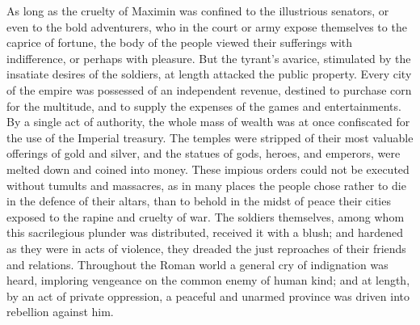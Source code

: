 As long as the cruelty of Maximin was confined to the illustrious
senators, or even to the bold adventurers, who in the court or
army expose themselves to the caprice of fortune, the body of the
people viewed their sufferings with indifference, or perhaps with
pleasure. But the tyrant’s avarice, stimulated by the insatiate
desires of the soldiers, at length attacked the public property.
Every city of the empire was possessed of an independent revenue,
destined to purchase corn for the multitude, and to supply the
expenses of the games and entertainments. By a single act of
authority, the whole mass of wealth was at once confiscated for
the use of the Imperial treasury. The temples were stripped of
their most valuable offerings of gold and silver, and the statues
of gods, heroes, and emperors, were melted down and coined into
money. These impious orders could not be executed without tumults
and massacres, as in many places the people chose rather to die
in the defence of their altars, than to behold in the midst of
peace their cities exposed to the rapine and cruelty of war. The
soldiers themselves, among whom this sacrilegious plunder was
distributed, received it with a blush; and hardened as they were
in acts of violence, they dreaded the just reproaches of their
friends and relations. Throughout the Roman world a general cry
of indignation was heard, imploring vengeance on the common enemy
of human kind; and at length, by an act of private oppression, a
peaceful and unarmed province was driven into rebellion against
him.\footnotemark[12]



